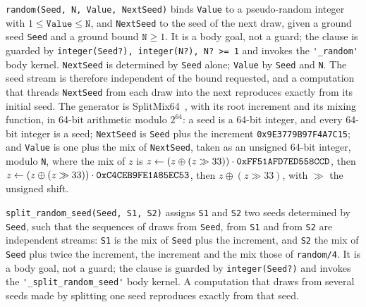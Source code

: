 \verb|random(Seed, N, Value, NextSeed)| binds \verb|Value| to a pseudo-random integer with $1 \leq \mathtt{Value} \leq \mathtt{N}$, and \verb|NextSeed| to the seed of the next draw, given a ground seed \verb|Seed| and a ground bound $\mathtt{N} \geq 1$. It is a body goal, not a guard; the clause is guarded by \verb|integer(Seed?), integer(N?), N? >= 1| and invokes the \verb|'_random'| body kernel. \verb|NextSeed| is determined by \verb|Seed| alone; \verb|Value| by \verb|Seed| and \verb|N|. The seed stream is therefore independent of the bound requested, and a computation that threads \verb|NextSeed| from each draw into the next reproduces exactly from its initial seed. The generator is SplitMix64~\cite{steele2014splitmix}, with its root increment and its mixing function, in 64-bit arithmetic modulo $2^{64}$: a seed is a 64-bit integer, and every 64-bit integer is a seed; \verb|NextSeed| is \verb|Seed| plus the increment \verb|0x9E3779B97F4A7C15|; and \verb|Value| is one plus the mix of \verb|NextSeed|, taken as an unsigned 64-bit integer, modulo \verb|N|, where the mix of $z$ is $z \leftarrow (z \oplus (z \gg 33)) \cdot \verb|0xFF51AFD7ED558CCD|$, then $z \leftarrow (z \oplus (z \gg 33)) \cdot \verb|0xC4CEB9FE1A85EC53|$, then $z \oplus (z \gg 33)$, with $\gg$ the unsigned shift.

\verb|split_random_seed(Seed, S1, S2)| assigns \verb|S1| and \verb|S2| two seeds determined by \verb|Seed|, such that the sequences of draws from \verb|Seed|, from \verb|S1| and from \verb|S2| are independent streams: \verb|S1| is the mix of \verb|Seed| plus the increment, and \verb|S2| the mix of \verb|Seed| plus twice the increment, the increment and the mix those of \verb|random/4|. It is a body goal, not a guard; the clause is guarded by \verb|integer(Seed?)| and invokes the \verb|'_split_random_seed'| body kernel. A computation that draws from several seeds made by splitting one seed reproduces exactly from that seed.

